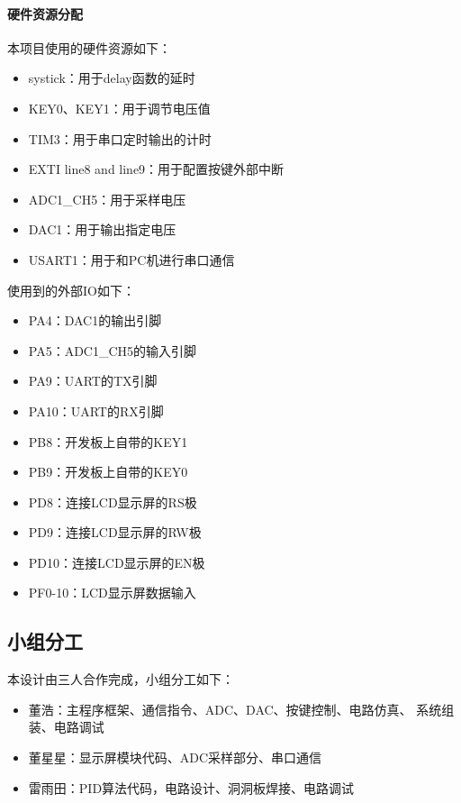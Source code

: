 \documentclass[a4paper]{article}
\theoremstyle{definition}
\theoremstyle{plain}
\theoremstyle{remark}
\begin{document}
\paragraph*{硬件资源分配}
\vspace*{-0.5em}
\noindent 本项目使用的硬件资源如下：
\vspace*{-0.5em}
\begin{itemize}
	\item systick：用于delay函数的延时
	\item KEY0、KEY1：用于调节电压值
	\item TIM3：用于串口定时输出的计时
	\item EXTI line8 and line9：用于配置按键外部中断
	\item ADC1\_CH5：用于采样电压
	\item DAC1：用于输出指定电压
	\item USART1：用于和PC机进行串口通信
\end{itemize}
使用到的外部IO如下：
\begin{itemize}
	\item PA4：DAC1的输出引脚
	\item PA5：ADC1\_CH5的输入引脚
	\item PA9：UART的TX引脚
	\item PA10：UART的RX引脚
	\item PB8：开发板上自带的KEY1
	\item PB9：开发板上自带的KEY0
	\item PD8：连接LCD显示屏的RS极
	\item PD9：连接LCD显示屏的RW极
	\item PD10：连接LCD显示屏的EN极
	\item PF0-10：LCD显示屏数据输入
\end{itemize}

\subsection{小组分工}
本设计由三人合作完成，小组分工如下：
\begin{itemize}
	\item 董浩：主程序框架、通信指令、ADC、DAC、按键控制、电路仿真、 系统组装、电路调试
	\item 董星星：显示屏模块代码、ADC采样部分、串口通信
	\item 雷雨田：PID算法代码，电路设计、洞洞板焊接、电路调试
\end{itemize}
\end{document}
